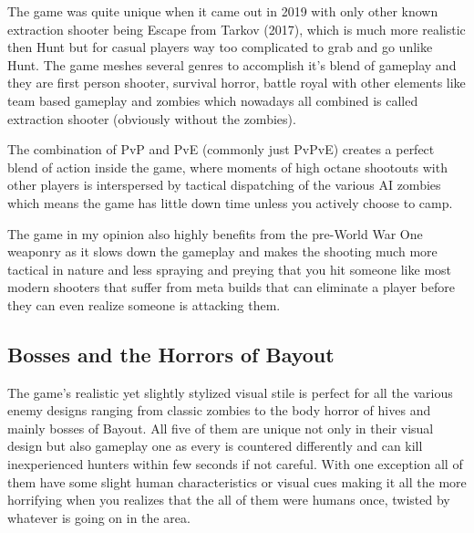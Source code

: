 \documentclass[a4paper,10pt,english]{article}
\begin{document}
The game was quite unique when it came out in 2019 with only other known extraction shooter being Escape from Tarkov (2017), which is much more realistic then Hunt but for casual players way too complicated to grab and go unlike Hunt. The game meshes several genres to accomplish it's blend of gameplay and they are first person shooter, survival horror, battle royal with other elements like team based gameplay and zombies which nowadays all combined is called extraction shooter (obviously without the zombies).

The combination of PvP and PvE (commonly just PvPvE) creates a perfect blend of action inside the game, where moments of high octane shootouts with other players is interspersed by tactical dispatching of the various AI zombies which means the game has little down time unless you actively choose to camp.

The game in my opinion also highly benefits from the pre-World War One weaponry as it slows down the gameplay and makes the shooting much more tactical in nature and less spraying and preying that you hit someone like most modern shooters that suffer from meta builds that can eliminate a player before they can even realize someone is attacking them.

\subsection*{Bosses and the Horrors of Bayout}

The game's realistic yet slightly stylized visual stile is perfect for all the various enemy designs ranging from classic zombies to the body horror of hives and mainly bosses of Bayout. All five of them are unique not only in their visual design but also gameplay one as every is countered differently and can kill inexperienced hunters within few seconds if not careful. With one exception all of them have some slight human characteristics or visual cues making it all the more horrifying when you realizes that the all of them were humans once, twisted by whatever is going on in the area.
\end{document}
